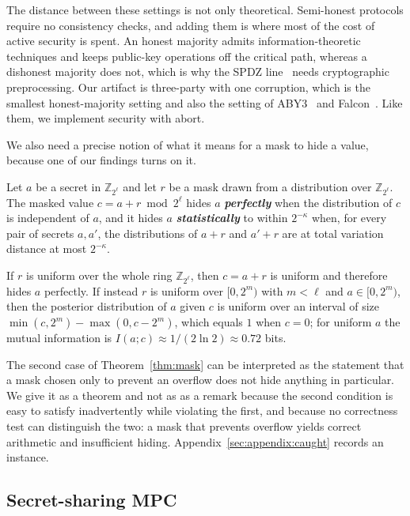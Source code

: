 \documentclass[11pt]{article}
\newcommand{\ib}[1]{\textbf{\emph{#1}}}
\newcommand{\Z}{\mathbb{Z}}
\begin{document}
The distance between these settings is not only theoretical. Semi-honest protocols require
no consistency checks, and adding them is where most of the cost of active security is
spent. An honest majority admits information-theoretic techniques and keeps public-key
operations off the critical path, whereas a dishonest majority does not, which is why the
SPDZ line~\cite{SPDZ,DamgardNielsen} needs cryptographic preprocessing. Our artifact is
three-party with one corruption, which is the smallest honest-majority setting and also the
setting of ABY3~\cite{ABY3} and Falcon~\cite{Falcon}. Like them, we implement security with
abort.

We also need a precise notion of what it means for a mask to hide a value, because one of
our findings turns on it.

\begin{definition}
\label{def:hiding}
Let $a$ be a secret in $\Z_{2^\ell}$ and let $r$ be a mask drawn from a distribution over
$\Z_{2^\ell}$. The masked value $c = a + r \bmod 2^{\ell}$ hides $a$ \ib{perfectly} when the
distribution of $c$ is independent of $a$, and it hides $a$ \ib{statistically} to within
$2^{-\kappa}$ when, for every pair of secrets $a,a'$, the distributions of $a+r$ and $a'+r$
are at total variation distance at most $2^{-\kappa}$.
\end{definition}

\begin{theorem}
\label{thm:mask}
If $r$ is uniform over the whole ring $\Z_{2^\ell}$, then $c = a+r$ is uniform and
therefore hides $a$ perfectly. If instead $r$ is uniform over $[0,2^{m})$ with $m < \ell$
and $a \in [0,2^{m})$, then the posterior distribution of $a$ given $c$ is uniform over an
interval of size $\min(c,2^m) - \max(0,c-2^m)$, which equals $1$ when $c = 0$; for uniform
$a$ the mutual information is $I(a;c) \approx 1/(2\ln 2) \approx 0.72$ bits.
\end{theorem}

The second case of Theorem~\ref{thm:mask} can be interpreted as the statement that a mask
chosen only to prevent an overflow does not hide anything in particular. We give it as a
theorem and not as as a remark because the second condition is easy to satisfy
inadvertently while violating the first, and because no correctness test can
distinguish the two: a mask that prevents overflow yields correct arithmetic and
insufficient hiding. Appendix~\ref{sec:appendix:caught} records an instance.

\subsection{Secret-sharing MPC}
\label{sec:prelim:mpc}
\end{document}
